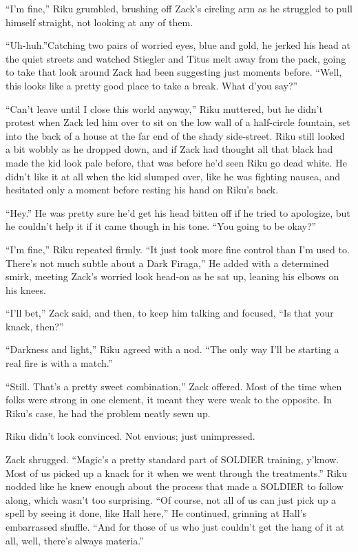 ``I'm fine,'' Riku grumbled, brushing off Zack's circling arm as he struggled to pull himself straight, not looking at any of them.

``Uh-huh.''Catching two pairs of worried eyes, blue and gold, he jerked his head at the quiet streets and watched Stiegler and Titus melt away from the pack, going to take that look around Zack had been suggesting just moments before. ``Well, this looks like a pretty good place to take a break. What d'you say?''

``Can't leave until I close this world anyway,'' Riku muttered, but he didn't protest when Zack led him over to sit on the low wall of a half-circle fountain, set into the back of a house at the far end of the shady side-street. Riku still looked a bit wobbly as he dropped down, and if Zack had thought all that black had made the kid look pale before, that was before he'd seen Riku go dead white. He didn't like it at all when the kid slumped over, like he was fighting nausea, and hesitated only a moment before resting his hand on Riku's back.

``Hey.'' He was pretty sure he'd get his head bitten off if he tried to apologize, but he couldn't help it if it came though in his tone. ``You going to be okay?''

``I'm fine,'' Riku repeated firmly. ``It just took more fine control than I'm used to. There's not much subtle about a Dark Firaga,'' He added with a determined smirk, meeting Zack's worried look head-on as he sat up, leaning his elbows on his knees.

``I'll bet,'' Zack said, and then, to keep him talking and focused, ``Is that your knack, then?''

``Darkness and light,'' Riku agreed with a nod. ``The only way I'll be starting a real fire is with a match.''

``Still. That's a pretty sweet combination,'' Zack offered. Most of the time when folks were strong in one element, it meant they were weak to the opposite. In Riku's case, he had the problem neatly sewn up.

Riku didn't look convinced. Not envious; just unimpressed.

Zack shrugged. ``Magic's a pretty standard part of SOLDIER training, y'know. Most of us picked up a knack for it when we went through the treatments.'' Riku nodded like he knew enough about the process that made a SOLDIER to follow along, which wasn't too surprising. ``Of course, not all of us can just pick up a spell by seeing it done, like Hall here,'' He continued, grinning at Hall's embarrassed shuffle. ``And for those of us who just couldn't get the hang of it at all, well, there's always materia.''

